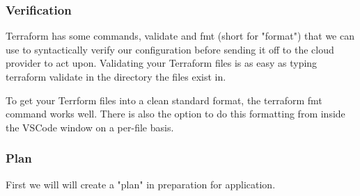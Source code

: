 \hypertarget{verification}{%
   \subsubsection{Verification}\label{verification}}

Terraform has some commands, validate and fmt (short for "format") that
we can use to syntactically verify our configuration before sending it
off to the cloud provider to act upon. Validating your Terraform files
is as easy as typing terraform validate in the directory the files exist
in.

\begin{Shaded}
   \begin{Highlighting}[]
   \end{Highlighting}
\end{Shaded}

To get your Terrform files into a clean standard format, the
terraform fmt command works well. There is also the option to do this
formatting from inside the VSCode window on a per-file basis.

\hypertarget{plan}{%
   \subsubsection{Plan}\label{plan}}

First we will will create a "plan" in preparation for application.

